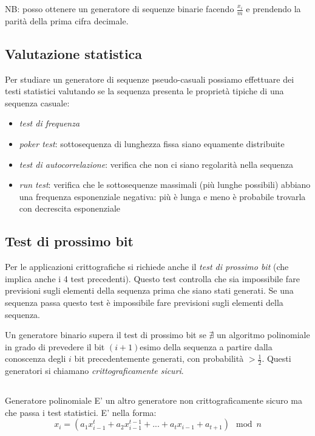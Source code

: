 NB: posso ottenere un generatore di sequenze binarie facendo $\frac{x_i}{m}$ e prendendo la parità della prima cifra decimale.

\subsection{Valutazione statistica}
Per studiare un generatore di sequenze pseudo-casuali possiamo effettuare dei testi statistici valutando se la sequenza presenta le proprietà tipiche di una sequenza casuale:
\begin{itemize}
    \item \emph{test di frequenza}
    \item \emph{poker test}: sottosequenza di lunghezza fissa siano equamente distribuite
    \item \emph{test di autocorrelazione}: verifica che non ci siano regolarità nella sequenza
    \item \emph{run test}: verifica che le sottosequenze massimali (più lunghe possibili) abbiano una frequenza esponenziale negativa: più è lunga e meno è probabile trovarla con decrescita esponenziale
\end{itemize}

\subsection{Test di prossimo bit}
Per le applicazioni crittografiche si richiede anche il \emph{test di prossimo bit} (che implica anche i 4 test precedenti). Questo test controlla che sia impossibile fare previsioni sugli elementi della sequenza prima che siano stati generati. Se una sequenza passa questo test è impossibile fare previsioni sugli elementi della sequenza.

Un generatore binario supera il test di prossimo bit se $ \nexists $ un algoritmo polinomiale in grado di prevedere il bit $(i+1)$esimo della sequenza a partire dalla conoscenza degli $i$ bit precedentemente generati, con probabilità $> \frac{1}{2}$. Questi generatori si chiamano \emph{crittograficamente sicuri}.

\subsection{}{Generatore polinomiale}
E' un altro generatore non crittograficamente sicuro ma che passa i test statistici. E' nella forma:
$$ x_{i} = \left( a_{1}x_{i-1}^{t} + a_{2}x_{i-1}^{t-1} + ... + a_{t}x_{i-1} + a_{t+1} \right) \mod n $$

